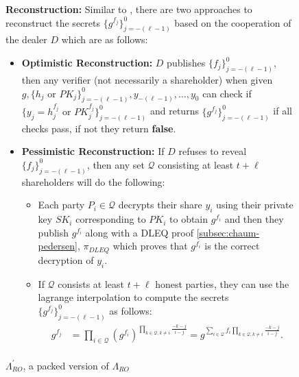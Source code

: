 \begin{figure}[ht]
{\begin{tcolorbox}[title=\textbf{$\Lambda_{RO}^{'}$}, width=1.2\textwidth, colframe=blue!75!black, colback=blue!10, sharp corners]
        \vspace{0.5em}
        \textbf{Reconstruction:}
            Similar to \cite{cryptoeprint:2025/576}, there are two approaches to reconstruct the secrets 
            $\{g^{f_j}\}_{j=-(\ell-1)}^0$ based on the cooperation of the dealer $D$ which are as follows:
            \begin{itemize}
                \item \textbf{Optimistic Reconstruction:} $D$ publishes $\{f_j\}_{j=-(\ell-1)}^0$, then any verifier (not necessarily a shareholder) 
                when given $g,\{h_j\text{ or }PK_j\}_{j=-(\ell-1)}^0,y_{-(\ell-1)},\dots,y_0$ can check if $\{y_j=h_j^{f_j}\text{ or }PK_j^{f_j}\}_{j=-(\ell-1)}^0$ 
                and returns $\{g^{f_j}\}_{j=-(\ell-1)}^0$ if all checks pass, if not they return \textbf{false}.
                \item \textbf{Pessimistic Reconstruction:} If $D$ refuses to reveal $\{f_j\}_{j=-(\ell-1)}^0$, then any set 
                $\mathcal{Q}$ consisting at least $t+\ell$ shareholders will do the following:
                \begin{itemize}
                    \item Each party $P_i\in\mathcal{Q}$ decrypts their share $y_i$ using their private key $SK_i$ 
                      corresponding to $PK_i$ to obtain $g^{f_i}$ and then they publish $g^{f_i}$ 
                      along with a DLEQ proof \ref{subsec:chaum-pedersen}, $\pi_{DLEQ}$ which proves that 
                      $g^{f_i}$ is the correct decryption of $y_i$.
                    \item If $\mathcal{Q}$ consists at least $t+\ell$ honest parties, they can use the 
                    lagrange interpolation to compute the secrets $\{g^{f_j}\}_{j=-(\ell-1)}^0$ as follows:
                    \begin{align*}
                        g^{f_j} &= \prod_{i\in\mathcal{Q}}(g^{f_i})^{\prod_{k\in\mathcal{Q},k\neq i}\frac{-k-j}{i-j}}= g^{\sum_{i\in\mathcal{Q}}f_i\prod_{k\in\mathcal{Q},k\neq i}\frac{-k-j}{i-j}}.\\
                    \end{align*}
                \end{itemize}
            \end{itemize}
    \end{tcolorbox}
    }
    \caption[PPPVSS]{$\Lambda_{RO}^{'}$, a packed version of $\Lambda_{RO}$ \cite{cryptoeprint:2025/576}}
    \label{fig:initial-packed-shamir-PPPVSS-ro}
\end{figure}